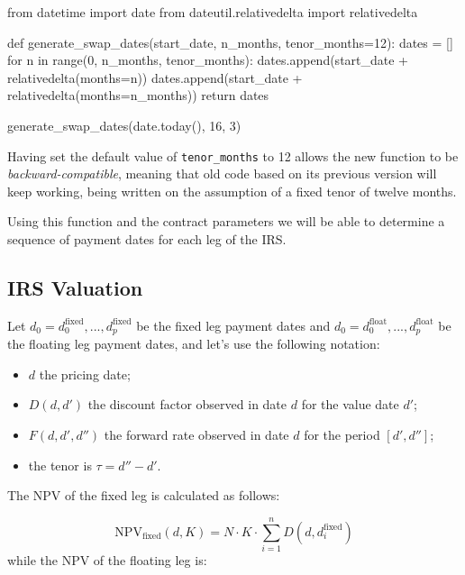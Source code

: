 \begin{ipython}
from datetime import date
from dateutil.relativedelta import relativedelta

def generate_swap_dates(start_date, n_months, tenor_months=12):
    dates = []
    for n in range(0, n_months, tenor_months):
        dates.append(start_date + relativedelta(months=n))
        dates.append(start_date + relativedelta(months=n_months))
    return dates
    
generate_swap_dates(date.today(), 16, 3)
\end{ipython}
\begin{ioutput}
\end{ioutput}
Having set the default value of \texttt{tenor\_months} to 12 allows the new function to be \emph{backward-compatible}, meaning that old code based on its previous version will keep working, being written on the assumption of a fixed tenor of twelve months. 
       
Using this function and the contract parameters we will be able to determine a sequence of payment dates for each leg of the IRS.

\subsection{IRS Valuation}\label{irs-valuation}

Let \(d_0=d_0^{\mathrm{fixed}},...,d_p^{\mathrm{fixed}}\) be the fixed leg payment dates and
\(d_0=d_0^{\mathrm{float}},...,d_p^{\mathrm{float}}\) be the floating leg payment dates, and let's use the following notation:

\begin{itemize}
\tightlist
\item
  \(d\) the pricing date;
\item
  \(D(d, d')\) the discount factor observed in date \(d\) for the value
  date \(d'\);
\item
  \(F(d, d', d'')\) the forward rate observed in date \(d\) for the
  period \([d', d'']\); 
  \item the tenor is \(\tau = d'' - d'\).
\end{itemize}
The NPV of the fixed leg is calculated as follows:

\begin{equation}
\mathrm{NPV}_{\mathrm{fixed}}(d, K) = N\cdot K\cdot\sum_{i=1}^{n}D(d, d_{i}^{\mathrm{fixed}})\end{equation}
while the NPV of the floating leg is:


